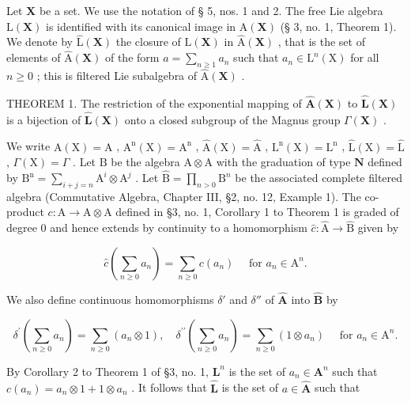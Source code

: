 Let \(\mathbf{X}\) be a set. We use the notation of § 5, nos. 1 and 2. The free Lie algebra \(\mathrm{L}(\mathbf{X})\) is identified with its canonical image in \(\mathrm{A}(\mathbf{X})\) (§ 3, no. 1, Theorem 1). We denote by \(\hat{\mathrm{L}}(\mathbf{X})\) the closure of \(\mathrm{L}(\mathbf{X})\) in \(\hat{\mathrm{A}}(\mathbf{X})\) , that is the set of elements of \(\hat{\mathrm{A}}(\mathbf{X})\) of the form \(a = \sum_{n\geqslant 1}a_n\) such that \(a_{n}\in \mathrm{L}^{n}(\mathrm{X})\) for all \(n\geqslant 0\) ; this is filtered Lie subalgebra of \(\hat{\mathrm{A}}(\mathbf{X})\) .

THEOREM 1. The restriction of the exponential mapping of \(\hat{\mathbf{A}}(\mathbf{X})\) to \(\hat{\mathbf{L}}(\mathbf{X})\) is a bijection of \(\hat{\mathbf{L}}(\mathbf{X})\) onto a closed subgroup of the Magnus group \(\Gamma(\mathbf{X})\) .

We write \(\mathrm{A}(\mathrm{X}) = \mathrm{A}\) , \(\mathrm{A}^{\mathrm{n}}(\mathrm{X}) = \mathrm{A}^{\mathrm{n}}\) , \(\hat{\mathrm{A}}(\mathrm{X}) = \hat{\mathrm{A}}\) , \(\mathrm{L}^{\mathrm{n}}(\mathrm{X}) = \mathrm{L}^{\mathrm{n}}\) , \(\hat{\mathrm{L}}(\mathrm{X}) = \hat{\mathrm{L}}\) , \(\Gamma(\mathrm{X}) = \Gamma\) . Let \(\mathrm{B}\) be the algebra \(\mathrm{A} \otimes \mathrm{A}\) with the graduation of type \(\mathbf{N}\) defined by \(\mathrm{B}^{\mathrm{n}} = \sum_{i+j=n} \mathrm{A}^{i} \otimes \mathrm{A}^{j}\) . Let \(\hat{\mathrm{B}} = \prod_{n > 0} \mathrm{B}^{n}\) be the associated complete filtered algebra (Commutative Algebra, Chapter III, §2, no. 12, Example 1). The co-product \(c: \mathrm{A} \to \mathrm{A} \otimes \mathrm{A}\) defined in §3, no. 1, Corollary 1 to Theorem 1 is graded of degree 0 and hence extends by continuity to a homomorphism \(\hat c: \hat{\mathrm{A}} \to \hat{\mathrm{B}}\) given by

\[
\hat {c} \left(\sum_ {n \geqslant 0} a _ {n}\right) = \sum_ {n \geqslant 0} c (a _ {n}) \quad \text { for } a _ {n} \in \mathrm{A} ^ {n}.
\]

We also define continuous homomorphisms \(\delta'\) and \(\delta''\) of \(\hat{\mathbf{A}}\) into \(\hat{\mathbf{B}}\) by

\[
\delta^ {\prime} \left(\sum_ {n \geqslant 0} a _ {n}\right) = \sum_ {n \geqslant 0} (a _ {n} \otimes 1), \quad \delta^ {\prime \prime} \left(\sum_ {n \geqslant 0} a _ {n}\right) = \sum_ {n \geqslant 0} (1 \otimes a _ {n}) \quad \text { for } a _ {n} \in \mathrm{A} ^ {n}.
\]

By Corollary 2 to Theorem 1 of §3, no. 1, \(\mathbf{L}^n\) is the set of \(a_{n}\in \mathbf{A}^{n}\) such that \(c(a_{n}) = a_{n}\otimes 1 + 1\otimes a_{n}\) . It follows that \(\hat{\mathbf{L}}\) is the set of \(a\in \hat{\mathbf{A}}\) such that

